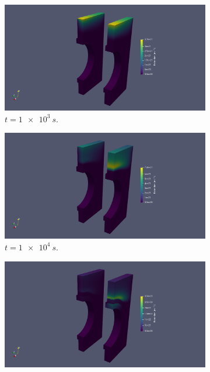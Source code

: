\begin{figure} [h]
    \centering
    \begin{subfigure}{0.45\linewidth}
        \centering
        \includegraphics[trim=500 0 300 0, clip, width=\linewidth]{Figures/Chapter3/monoblocks/3D_monoblocks/retention_1e3s.png}
        \caption{$t=\SI{1e3}{s}$.}
    \end{subfigure}%
    \qquad
    \begin{subfigure}{0.45\linewidth}
        \centering
        \includegraphics[trim=500 0 300 0, clip, width=\linewidth]{Figures/Chapter3/monoblocks/3D_monoblocks/retention_1e4s.png}
        \caption{$t=\SI{1e4}{s}$.}
    \end{subfigure}
    \begin{subfigure}{0.45\linewidth}
        \centering
        \includegraphics[trim=500 0 300 0, clip, width=\linewidth]{Figures/Chapter3/monoblocks/3D_monoblocks/retention_1e5s.png}

\end{subfigure}
\end{figure}
